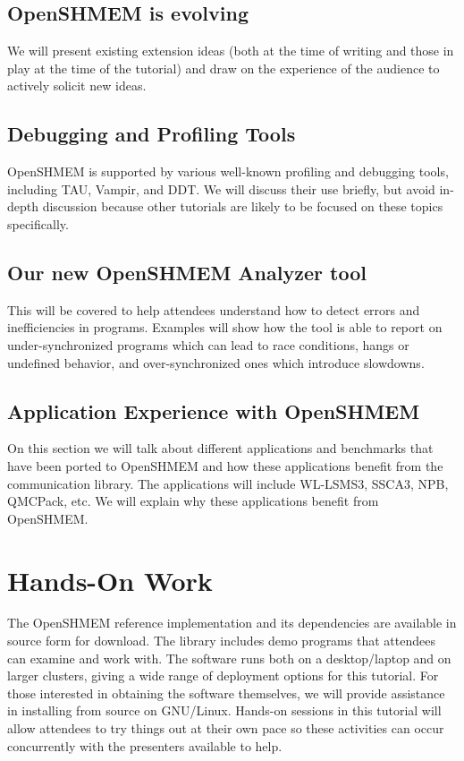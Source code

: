 \documentclass[10pt,english]{article}
\begin{document}
\subsection{OpenSHMEM is evolving}

  We will present existing extension ideas (both at the time of
  writing and those in play at the time of the tutorial) and draw on
  the experience of the audience to actively solicit new ideas.

\subsection{Debugging and Profiling Tools}

  OpenSHMEM is supported by various well-known profiling and debugging
  tools, including TAU, Vampir, and DDT.  We will discuss their use
  briefly, but avoid in-depth discussion because other tutorials are
  likely to be focused on these topics specifically.

\subsection{Our new OpenSHMEM Analyzer tool}

  This will be covered to help attendees understand how to detect
  errors and inefficiencies in programs.  Examples will show how the
  tool is able to report on under-synchronized programs which can lead
  to race conditions, hangs or undefined behavior, and
  over-synchronized ones which introduce slowdowns.
  
\subsection {Application Experience with OpenSHMEM}
On this section we will talk about different applications and benchmarks that
have been ported to OpenSHMEM and how these applications benefit
from the communication library. The applications will include WL-LSMS3, 
SSCA3,  NPB, QMCPack, etc. We will explain why these applications benefit
from OpenSHMEM.

\section{Hands-On Work}

The OpenSHMEM reference implementation and its dependencies are
available in source form for download.  The library includes demo
programs that attendees can examine and work with.  The software runs
both on a desktop/laptop and on larger clusters, giving a wide range
of deployment options for this tutorial.  For those interested in
obtaining the software themselves, we will provide assistance in
installing from source on GNU/Linux.  Hands-on sessions in this
tutorial will allow attendees to try things out at their own pace so
these activities can occur concurrently with the presenters available
to help.
\end{document}
